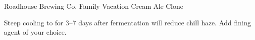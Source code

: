 \documentclass[parskip=half,fontsize=9pt,oneside]{scrbook}
\begin{document}
\mainmatter


\begin{recipe}{Roadhouse Brewing Co. Family Vacation Cream Ale Clone}

\begin{aboutblock}
\sourceaha
\end{aboutblock}


\begin{methodandtiming}

\begin{mashsteps}
\end{mashsteps}

\begin{fermentationsteps}
\end{fermentationsteps}

\begin{directions}
Steep cooling to  for 3--7 days after fermentation will reduce chill haze.
Add fining agent of your choice.
\end{directions}

\end{methodandtiming}

\recipebreak

\begin{ingredientsblock}

\begin{malts}
\end{malts}

\begin{hops}
\end{hops}


\end{ingredientsblock}

\end{recipe}


\end{document}
